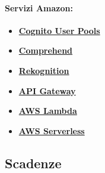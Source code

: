 	\paragraph{\textbf{Servizi Amazon:}} 
\begin{itemize}
	\item
	\href {https://docs.aws.amazon.com/cognito/latest/developerguide/cognito-user-identity-pools.html}{\textbf{Cognito User Pools}}
	\item
	\href{https://docs.aws.amazon.com/comprehend/latest/dg/what-is.html}{\textbf{Comprehend}}
	\item 
	\href{https://docs.aws.amazon.com/rekognition/latest/dg/what-is.html}{\textbf{Rekognition}}
	\item 
	\href{https://docs.aws.amazon.com/apigateway/latest/developerguide/welcome.html}{\textbf{API Gateway}}
	\item
	\href{https://docs.aws.amazon.com/lambda/latest/dg/welcome.html}{\textbf{AWS Lambda}}
	\item 
	\href{https://docs.aws.amazon.com/serverless-application-model/latest/developerguide/what-is-sam.html}{\textbf{AWS Serverless}}
\end{itemize}

\subsection*{Scadenze}
